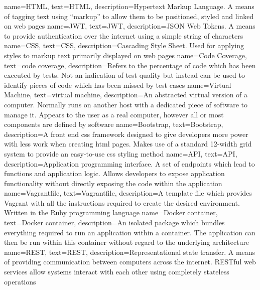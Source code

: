 {
    name={HTML},
    text={HTML},
    description={Hypertext Markup Language. A means of tagging text using ``markup'' to allow them to be positioned, styled and linked on web pages}
}
{
    name={JWT},
    text={JWT},
    description={JSON Web Tokens. A means to provide authentication over the internet using a simple string of characters}
}
{
    name={CSS},
    text={CSS},
    description={Cascading Style Sheet. Used for applying styles to markup text primarily displayed on web pages}
}
{
    name={Code Coverage},
    text={code coverage},
    description={Refers to the percentage of code which has been executed by tests. Not an indication of test quality but instead can be used to identify pieces of code which has been missed by test cases}
}
{
    name={Virtual Machine},
    text={virtual machine},
    description={An abstracted virtual version of a computer. Normally runs on another host with a dedicated piece of software to manage it. Appears to the user as a real computer, however all or most components are defined by software}
}
{
    name={Bootstrap},
    text={Bootstrap},
    description={A front end css framework designed to give developers more power with less work when creating html pages. Makes use of a standard 12-width grid system to provide an easy-to-use css styling method}
}
{
    name={API},
    text={API},
    description={Application programming interface. A set of endpoints which lead to functions and application logic. Allows developers to expose application functionality without directly exposing the code within the application}
}
{
    name={Vagrantfile},
    text={Vagrantfile},
    description={A template file which provides Vagrant with all the instructions required to create the desired environment. Written in the Ruby programming language}
}
{
    name={Docker container},
    text={Docker container},
    description={An isolated package which bundles everything required to run an application within a container. The application can then be run within this container without regard to the underlying architecture}
}
{
    name={REST},
    text={REST},
    description={Representational state transfer. A means of providing communication between computers across the internet. RESTful web services allow systems interact with each other using completely stateless operations}
}
